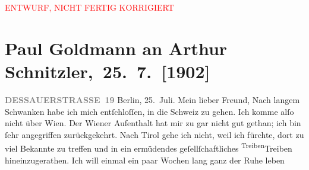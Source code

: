 
\begin{center}
            \textcolor{red}{ENTWURF, NICHT FERTIG KORRIGIERT}
                      \end{center}
            
         
         \renewcommand{\erwaehntePersonen}{Personen: Otto Brahm, Raphael Löwenfeld, Walther Rathenau, Olga Schnitzler, Elisabeth Steinrück}
         \renewcommand{\erwaehnteInstitutionen}{Institutionen: S. Hirzel Verlag (Leipzig), Schiller-Theater}
         \renewcommand{\erwaehnteOrte}{Orte: Berlin, Dessauer Straße, Kaltenleutgeben, Leipzig, Schweiz, Südtirol, Tirol, Wien}
         \renewcommand{\erwaehnteWerke}{Werke: Der Schleier der Beatrice. Schauspiel in fünf Akten, Impressionen}
               \section[ Paul Goldmann an Arthur Schnitzler, 25. 7. {[}1902{]}]{ Paul Goldmann an Arthur Schnitzler, 25. 7. {[}1902{]}}\nopagebreak{}\rehead{ }\begin{ledgroupsized}[t]{13cm}\normalsize\beginnumbering \toendnotes[C]{\smallbreak\pagebreak[2]} 
\toendnotes[C]{\smallbreak}\pstart
           \noindent{}\raggedleft{}{\pb}\textcolor{gray}{\textbf{DESSAUERSTRASSE 19}}\pend
           \pstart
           Berlin, 25. Juli.\pend
           \pstart\center{}Mein lieber Freund,\pend\pstart
           Nach langem Schwanken habe ich mich entſchloſſen, in die Schweiz zu gehen. Ich komme alſo nicht über Wien. Der Wiener Aufenthalt
               hat mir zu \label{K_L03214-1v}\label{K_L03214-1h} gar nicht gut gethan; ich  bin ſehr
               angegriffen zurückgekehrt. Nach Tirol gehe ich
               nicht, weil ich fürchte, dort zu viel Bekannte zu treffen und in ein ermüdendes
               geſellſchaftliches {\pb}\substVorne{}\textsuperscript{Treiben}{\allowbreak}\substDazwischen{}Treiben\substHinten{} hineinzugerathen. Ich will einmal ein paar Wochen lang ganz der Ruhe leben

\end{ledgroupsized}

